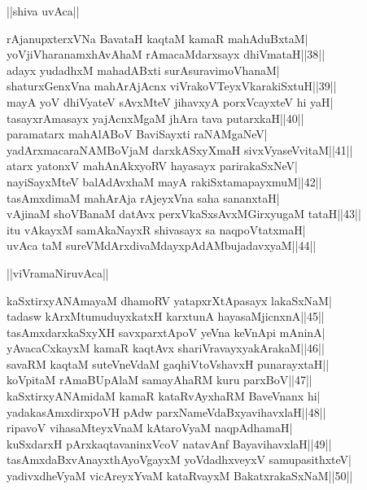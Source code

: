 \documentclass{article}
\begin{document}
\begin{center}
||shiva uvAca||
\end{center}

rAjanupxterxVNa BavataH kaqtaM kamaR mahAduBxtaM|\\
yoVjiVharanamxhAvAhaM rAmacaMdarxsayx dhiVmataH||38||\\
adayx yudadhxM mahadABxti surAsuravimoVhanaM|\\
shaturxGenxVna mahArAjAcnx viVrakoVTeyxVkarakiSxtuH||39||\\
mayA yoV dhiVyateV sAvxMteV jihavxyA porxVcayxteV hi yaH|\\
tasayxrAmasayx yajAcnxMgaM j{hA}ra tava putarxkaH||40||\\
paramatarx mahAlABoV BaviSayxti raNAMgaNeV|\\
yadArxmacaraNAMBoVjaM darxkASxyXmaH sivxVyaseVvitaM||41||\\
atarx yatonxV mahAnAkxyoRV hayasayx parirakaSxNeV|\\
nayiSayxMteV balAdAvxhaM mayA rakiSxtamapayxmuM||42||\\
tasAmxdimaM mahArAja rAjeyxVna saha sananxtaH|\\
vAjinaM shoVBanaM datAvx perxVkaSxsAvxMGirxyugaM tataH||43||\\
itu vAkayxM samAkaNayxR shivasayx sa naqpoVtatxmaH|\\
uvAca taM sureVMdArxdivaMdayxpAdAMbujadavxyaM||44||\\

\begin{center}
||viVramaNiruvAca||
\end{center}

kaSxtirxyANAmayaM dhamoRV yatapxrXtApasayx lakaSxNaM|\\
tadasw kArxMtumuduyxkatxH karxtunA hayasaMjicnxnA||45||\\
tasAmxdarxkaSxyXH savxparxtApoV yeVna keVnApi mAninA|\\
yAvacaCxkayxM kamaR kaqtAvx shariVravayxyakArakaM||46||\\
savaRM kaqtaM suteVneVdaM gaqhiVtoVshavxH punarayxtaH||\\
koVpitaM rAmaBUpAlaM samayAhaRM kuru parxBoV||47||\\
kaSxtirxyANAmidaM kamaR kataRvAyxhaRM BaveVnanx hi|\\
yadakasAmxdirxpoVH pAdw parxNameVdaBxyavihavxlaH||48||\\
ripavoV vihasaMteyxVnaM kAtaroVyaM naqpAdhamaH|\\
kuSxdarxH pArxkaqtavaninxVcoV natavAnf BayavihavxlaH||49||\\
tasAmxdaBxvAnayxthAyoVgayxM yoVdadhxveyxV samupasithxteV|\\
yadivxdheVyaM vicAreyxYvaM kataRvayxM BakatxrakaSxNaM||50||\\
\end{document}
